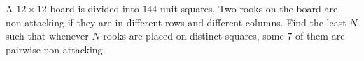 A $12\times12$ board is divided into $144$ unit squares. Two rooks on the board are non-attacking if they are in different rows and different columns. Find the least $N$ such that whenever $N$ rooks are placed on distinct squares, some $7$ of them are pairwise non-attacking.
